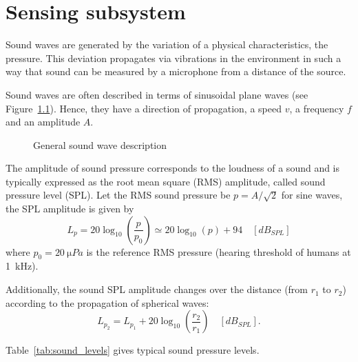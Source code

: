 \documentclass{EPL-master-thesis-covers-EN}
\begin{document}
\chapter{Sensing subsystem}

Sound waves are generated by the variation of a physical characteristics, the pressure. This deviation propagates via vibrations in the environment in such a way that sound can be measured by a microphone from a distance of the source.

Sound waves are often described in terms of sinusoidal plane waves (see Figure~\ref{fig:sound_wave}). Hence, they have a direction of propagation, a speed $v$, a frequency $f$ and an amplitude $A$. 

\begin{figure}[H]
\centering
{}
\caption{General sound wave description}
\label{fig:sound_wave}
\end{figure}

The amplitude of sound pressure corresponds to the loudness of a sound and is typically expressed as the root mean square (RMS) amplitude, called sound
pressure level (SPL). Let the RMS sound pressure be $p=A/\sqrt{2}$ for sine waves, the SPL amplitude is given by
\[
 L_p = 20\log_{10}\left(\frac{p}{p_0}\right) \simeq 20\log_{10}(p) + 94 \quad [\si{dB_{SPL}}]
\]
where $p_0=\SI{20}{\micro Pa}$ is the reference RMS pressure (hearing threshold of humans at \SI{1}{kHz}).

Additionally, the sound SPL amplitude changes over the distance (from $r_1$ to $r_2$) according to the propagation of spherical waves:
\[
 L_{p_2} = L_{p_1} + 20\log_{10}\left(\frac{r_2}{r_1}\right) \quad [\si{dB_{SPL}}].
\]

Table~\ref{tab:sound_levels} gives typical sound pressure levels.
\end{document}
